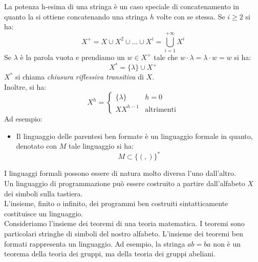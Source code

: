 \documentclass[12pt]{report}
\begin{document}
	La potenza h-esima di una stringa è un caso speciale di concatenamento in quanto la si ottiene concatenando una stringa $h$ volte con se stessa.
	{
	}
	Se $i \geq 2$ si ha:
	\[
	X^+ = X \cup X^2 \cup \dots \cup X^i = \bigcup_{i=1}^{+\infty}X^i
	\]
	Se $\lambda$ è la parola vuota e prendiamo un $w \in X^+$ tale che $w \cdot \lambda = \lambda \cdot w= w$ si ha:
	\[
	X^* = \{\lambda\} \cup X^+
	\]
	$X^*$ si chiama \textit{chiusura riflessiva transitiva} di $X$. \\
	Inoltre, si ha:
	\[
	X^h = \begin{cases}
		\{\lambda\} &  h=0 \\
		XX^{h-1} & \text{altrimenti}
	\end{cases}
	\]
	{
	}
	Ad esempio:
	\begin{itemize}
		\item Il linguaggio delle parentesi ben formate è un linguaggio formale in quanto, denotato con $M$ tale linguaggio si ha: \[
			M \subset \{(,)\}^*
		\]
	\end{itemize}
	I linguaggi formali possono essere di natura molto diversa l'uno dall'altro. \\
	Un linguaggio di programmazione può essere costruito a partire dall'alfabeto $X$ dei simboli sulla tastiera. \\
	L'insieme, finito o infinito, dei programmi ben costruiti sintatticamente costituisce un linguaggio. \\
	Consideriamo l'insieme dei teoremi di una teoria matematica. I teoremi sono particolari stringhe di simboli del nostro alfabeto. L'insieme dei teoremi ben formati rappresenta un linguaggio. Ad esempio, la stringa $ab=ba$ non è un teorema della teoria dei gruppi, ma della teoria dei gruppi abeliani.
\end{document}
